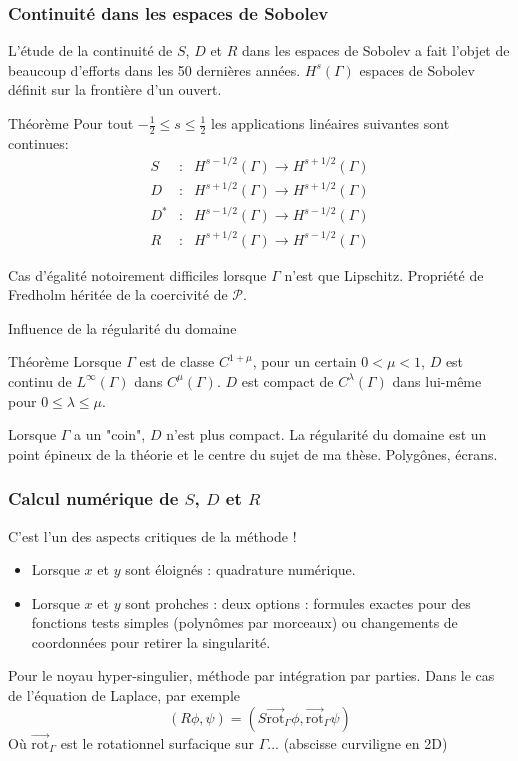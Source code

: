 \documentclass[11pt]{beamer}
\begin{document}
	\begin{frame}
		\frametitle{Continuité dans les espaces de Sobolev}
		L'étude de la continuité de $S$, $D$ et $R$ dans les espaces de Sobolev a fait l'objet de beaucoup d'efforts dans les 50 dernières années. 
		$H^s(\Gamma)$ espaces de Sobolev définit sur la frontière d'un ouvert.  
		\begin{block}{Théorème}
			Pour tout $-\frac{1}{2} \leq s \leq \frac{1}{2}$ les applications linéaires suivantes sont continues:
			\vspace{-0.4cm}
			\begin{eqnarray*}
				S &:& H^{s-1/2}(\Gamma) \to H^{s+1/2}(\Gamma)\\
				D &:& H^{s+1/2}(\Gamma) \to H^{s+1/2}(\Gamma)\\
				D^*&:& H^{s-1/2}(\Gamma) \to H^{s-1/2}(\Gamma)\\
				R &:& H^{s+1/2}(\Gamma) \to H^{s-1/2}(\Gamma)
			\end{eqnarray*}
		\end{block}	
		Cas d'égalité notoirement difficiles lorsque $\Gamma$ n'est que Lipschitz. Propriété de Fredholm héritée de la coercivité de $\mathcal{P}$. 	
	\end{frame}
	\begin{frame}
		Influence de la régularité du domaine
		\begin{block}{Théorème}
			Lorsque $\Gamma$ est de classe $C^{1+\mu}$, pour un certain $0<\mu < 1$, $D$ est continu de $L^{\infty}(\Gamma)$ dans $C^{\mu}(\Gamma)$. $D$ est compact de $C^\lambda(\Gamma)$ dans lui-même pour $0\leq \lambda \leq \mu$. 
		\end{block}
		Lorsque $\Gamma$ a un "coin", $D$ n'est plus compact.
		La régularité du domaine est un point épineux de la théorie et le centre du sujet de ma thèse. Polygônes, écrans. 
	\end{frame}
	\begin{frame}
		\frametitle{Calcul numérique de $S$, $D$ et $R$}
		C'est l'un des aspects critiques de la méthode !
		\begin{itemize}
			\item Lorsque $x$ et $y$ sont éloignés : quadrature numérique.
			\item Lorsque $x$ et $y$ sont prohches : deux options : formules exactes pour des fonctions tests simples (polynômes par morceaux) ou changements de coordonnées pour retirer la singularité. 
		\end{itemize}
		Pour le noyau hyper-singulier, méthode par intégration par parties. Dans le cas de l'équation de Laplace, par exemple
		\[(R\phi,\psi) = (S \overrightarrow{\text{rot}}_\Gamma \phi, \overrightarrow{\text{rot}}_\Gamma\psi)\]
		Où $\overrightarrow{\text{rot}}_\Gamma$ est le rotationnel surfacique sur $\Gamma$... (abscisse curviligne en 2D)
	\end{frame}
\end{document}
